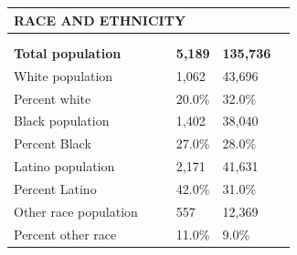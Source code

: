 \documentclass[9pt]{report}
\begin{document}
\vspace{12pt}
\setlength{\tabcolsep}{.01in} %
\begin{tabular}{p{.10in}p{.10in}p{.10in}p{3.7in}>{\hfill}p{.85in}>{\hfill}p{.85in}>{\hfill}p{.85in}>{\hfill}p{.85in}p{0.1in}}
\multicolumn{9}{l}{\parbox{7.1in}{\raggedright{\large{\strut\textbf{RACE AND ETHNICITY}\strut}}}} \\ 
\hline
\multicolumn{4}{l}{\parbox{3.5in}{\raggedright{\textbf{}}}} & \multicolumn{1}{r}{\parbox{.85in}{\strut\raggedleft{\textbf{}\strut}}} & \multicolumn{1}{r}{\parbox{.85in}{\strut\raggedleft{\textbf{}\strut}}} & \multicolumn{1}{r}{\parbox{.85in}{\strut{}}} & \multicolumn{1}{r}{\parbox{.85in}{\strut{}}} & \\ 
\multicolumn{9}{l}{} \\ 
\multicolumn{4}{l}{\parbox{3.5in}{\strut\raggedright{\textbf{Total population}\strut}}} & \textbf{} & \textbf{} & \textbf{5,189} & \textbf{135,736} & \textbf{} \\ 
\multicolumn{4}{l}{\parbox{3.6in}{\strut\raggedright{{White population}}\strut}} &  &  & 1,062 & 43,696 & \multicolumn{1}{l}{}  \\ 
\multicolumn{4}{l}{\parbox{3.6in}{\strut\raggedright{{Percent white}}\strut}} &  &  & 20.0\% & 32.0\% & \multicolumn{1}{l}{}  \\ 
\multicolumn{4}{l}{\parbox{3.6in}{\strut\raggedright{{Black population}}\strut}} &  &  & 1,402 & 38,040 & \multicolumn{1}{l}{}  \\ 
\multicolumn{4}{l}{\parbox{3.6in}{\strut\raggedright{{Percent Black}}\strut}} &  &  & 27.0\% & 28.0\% & \multicolumn{1}{l}{}  \\ 
\multicolumn{4}{l}{\parbox{3.6in}{\strut\raggedright{{Latino population}}\strut}} &  &  & 2,171 & 41,631 & \multicolumn{1}{l}{}  \\ 
\multicolumn{4}{l}{\parbox{3.6in}{\strut\raggedright{{Percent Latino}}\strut}} &  &  & 42.0\% & 31.0\% & \multicolumn{1}{l}{}  \\ 
\multicolumn{4}{l}{\parbox{3.6in}{\strut\raggedright{{Other race population}}\strut}} &  &  & 557 & 12,369 & \multicolumn{1}{l}{}  \\ 
\multicolumn{4}{l}{\parbox{3.6in}{\strut\raggedright{{Percent other race}}\strut}} &  &  & 11.0\% & 9.0\% & \multicolumn{1}{l}{}  \\ 

\end{tabular}
\setlength{\tabcolsep}{6pt} %
\end{document}
